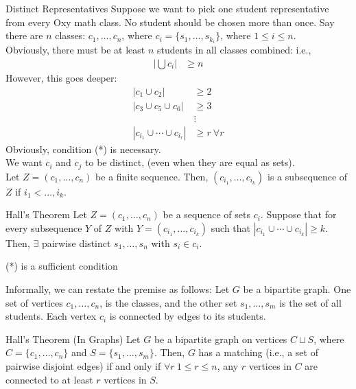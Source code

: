 \documentclass[10pt]{extarticle}
\begin{document}
  \begin{problem}{Distinct Representatives}
    Suppose we want to pick one student representative from every Oxy math class. No student should be chosen more than once. Say there are $n$ classes: $c_1,\dots,c_n$, where $c_i = \{s_1,\dots,s_{k_i}\}$, where $1\leq i \leq n$.\\

    Obviously, there must be at least $n$ students in all classes combined: i.e.,
    \begin{align*}
      \left|\bigcup c_i\right| &\geq n
    \end{align*}
    However, this goes deeper:
    \begin{align*}
      |c_1 \cup c_2| &\geq 2\\
      |c_3 \cup c_5 \cup c_6| &\geq 3\\
                              &\vdots\\
      |c_{i_1} \cup \cdots \cup c_{i_r}| &\geq r~\forall r\tag*{(*)}
    \end{align*}
    Obviously, condition (*) is necessary.\\

    We want $c_i$ and $c_j$ to be distinct, (even when they are equal as sets).\\

    Let $Z = (c_1,\dots,c_n)$ be a finite sequence. Then, $(c_{i_1},\dots,c_{i_k})$ is a subsequence of $Z$ if $i_1<\dots,i_k$.
    \begin{problem}{Hall's Theorem}
      Let $Z = (c_1,\dots,c_n)$ be a sequence of sets $c_i$. Suppose that for every subsequence $Y$ of $Z$ with $Y = (c_{i_1},\dots,c_{i_k})$ such that $|c_{i_1} \cup \cdots \cup c_{i_k}| \geq k$. Then, $\exists$ pairwise distinct $s_1,\dots,s_n$ with $s_i\in c_i$.
      \begin{description}
        \tiny
        \item[Note] (*) is a sufficient condition
      \end{description}
    \end{problem}
      Informally, we can restate the premise as follows: Let $G$ be a bipartite graph. One set of vertices $c_1,\dots,c_n$, is the classes, and the other set $s_1,\dots,s_m$ is the set of all students. Each vertex $c_i$ is connected by edges to its students.
    \begin{problem}{Hall's Theorem (In Graphs)}
      Let $G$ be a bipartite graph on vertices $C\sqcup S$, where $C = \{c_1,\dots,c_n\}$ and $S = \{s_1,\dots,s_m\}$. Then, $G$ has a matching (i.e., a set of pairwise disjoint edges) if and only if $\forall r~1\leq r\leq n$, any $r$ vertices in $C$ are connected to at least $r$ vertices in $S$.
    \end{problem}
  \end{problem}
\end{document}

